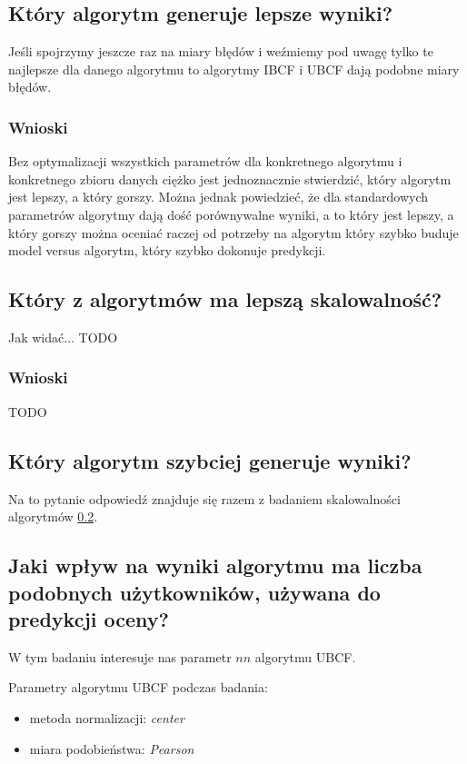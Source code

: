 \documentclass[12pt, a4paper]{article}
\begin{document}
\subsection{Który algorytm generuje lepsze wyniki?}
Jeśli spojrzymy jeszcze raz na miary błędów i weźmiemy pod uwagę tylko te najlepsze dla danego algorytmu to  algorytmy IBCF i UBCF dają podobne miary błędów.





\subsubsection{Wnioski}
Bez optymalizacji wszystkich parametrów dla konkretnego algorytmu i konkretnego zbioru danych ciężko jest jednoznacznie stwierdzić, który algorytm jest lepszy, a który gorszy. Można jednak powiedzieć, że dla standardowych parametrów algorytmy dają dość porównywalne wyniki, a to który jest lepszy, a który gorszy można oceniać raczej od potrzeby na algorytm który szybko buduje model versus algorytm, który szybko dokonuje predykcji.

\subsection{Który z algorytmów ma lepszą skalowalność?}
\label{skalowalnosc-pytanie}

Jak widać... TODO

\subsubsection{Wnioski}
TODO

\subsection{Który algorytm szybciej generuje wyniki?}
Na to pytanie odpowiedź znajduje się razem z badaniem skalowalności algorytmów \ref{skalowalnosc-pytanie}.

\subsection{Jaki wpływ na wyniki algorytmu ma liczba podobnych użytkowników, używana do predykcji oceny?}
W tym badaniu interesuje nas parametr $nn$ algorytmu UBCF. 

Parametry algorytmu UBCF podczas badania:
\begin{itemize}
\item metoda normalizacji: \emph{center}
\item miara podobieństwa: \emph{Pearson}
\end{itemize}
\end{document}
